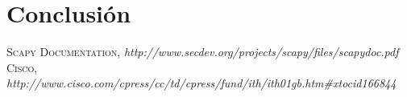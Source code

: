\documentclass{udpreport}
\begin{document}
\chapter{Conclusión}

  	      
\begin{thebibliography}{x}
 \textsc{Scapy Documentation},
\textit{http://www.secdev.org/projects/scapy/files/scapydoc.pdf}
 \textsc{Cisco},
\textit{ http://www.cisco.com/cpress/cc/td/cpress/fund/ith/ith01gb.htm#xtocid166844}
\end{thebibliography}
\end{document}

